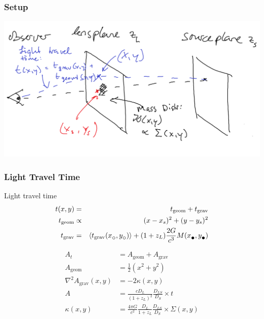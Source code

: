 \documentclass{beamer}
\newcommand{\subcirc}{{\lower.33ex\hbox{$\circ$}}}
\newcommand{\subbullet}{{\lower.33ex\hbox{$\bullet$}}}
\begin{document}
\begin{frame}
	\frametitle{Setup}
	\includegraphics[width=\textwidth]{imgs/sketch_arrtime}
\end{frame}


\begin{frame}
	\frametitle{Light Travel Time}
	\begin{block}{Light travel time}
		\begin{eqnarray}
			t(x,y) &=& t_\text{geom} + t_\text{grav} \\
			t_\text{geom} &\propto & (x - x_s)^2 + (y-y_s)^2 \\
			t_\text{grav} &=& \left\langle t_\text{grav}(x_\subcirc,y_\subcirc) \right\rangle + (1+z_L) \frac{2G}{c^3} M(x_\subbullet,y_\subbullet)
		\end{eqnarray}
	\end{block}
\end{frame}



\begin{frame}
  \begin{align}
    A_t &= A_\text{geom} + A_\text{grav}\\
    A_\text{geom} &= \frac{1}{2}\left(x^2+y^2\right)\\
    \nabla^2 A_\text{grav}\left(x,y\right) &= -2\kappa\left(x,y\right)\\
    A           &= \frac{cD_L}{(1+z_L)^2} \frac{D_{LS}}{D_S} \times t \\
    \kappa(x,y) &= \frac{4\pi G}{c^2} \frac{D_L}{1+z_L} \frac{D_{LS}}{D_S} \times \Sigma(x,y)
  \end{align}
  
\end{frame}
\end{document}
